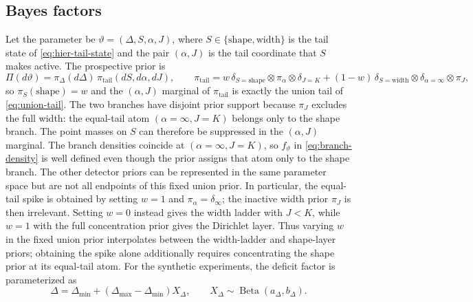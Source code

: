 \documentclass[11pt]{article}
\begin{document}
\FloatBarrier
\subsection{Bayes factors}
\label{sec:bayes-factors}

Let the parameter be $\vartheta=(\Delta,S,\alpha,J)$, where $S\in\{\mathrm{shape},\mathrm{width}\}$ is the tail state of \eqref{eq:hier-tail-state} and the pair $(\alpha,J)$ is the tail coordinate that $S$ makes active.  The prospective prior is
\begin{equation}
  \Pi(d\vartheta)=\pi_\Delta(d\Delta)\,\pi_{\mathrm{tail}}(dS,d\alpha,dJ),
  \qquad
  \pi_{\mathrm{tail}}=w\,\delta_{S=\mathrm{shape}}\otimes\pi_\alpha\otimes\delta_{J=K}
  +(1-w)\,\delta_{S=\mathrm{width}}\otimes\delta_{\alpha=\infty}\otimes\pi_J,
  \label{eq:prospective-prior}
\end{equation}
so $\pi_S(\mathrm{shape})=w$ and the $(\alpha,J)$ marginal of $\pi_{\mathrm{tail}}$ is exactly the union tail of \eqref{eq:union-tail}.  The two branches have disjoint prior support because $\pi_J$ excludes the full width: the equal-tail atom $(\alpha=\infty,J=K)$ belongs only to the shape branch.  The point masses on $S$ can therefore be suppressed in the $(\alpha,J)$ marginal.  The branch densities coincide at $(\alpha=\infty,J=K)$, so $f_\vartheta$ in \eqref{eq:branch-density} is well defined even though the prior assigns that atom only to the shape branch.  The other detector priors can be represented in the same parameter space but are not all endpoints of this fixed union prior.  In particular, the equal-tail spike is obtained by setting $w=1$ and $\pi_\alpha=\delta_\infty$; the inactive width prior $\pi_J$ is then irrelevant.  Setting $w=0$ instead gives the width ladder with $J<K$, while $w=1$ with the full concentration prior gives the Dirichlet layer.  Thus varying $w$ in the fixed union prior interpolates between the width-ladder and shape-layer priors; obtaining the spike alone additionally requires concentrating the shape prior at its equal-tail atom.  For the synthetic experiments, the deficit factor is parameterized as
\begin{equation}
  \Delta=\Delta_{\min}+(\Delta_{\max}-\Delta_{\min})X_\Delta,
  \qquad X_\Delta\sim\operatorname{Beta}(a_\Delta,b_\Delta).
\end{equation}
\end{document}
